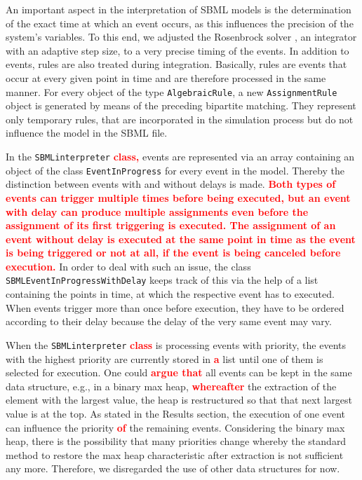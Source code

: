 \documentclass[10pt]{bmc_article}
\newenvironment{bmcformat}{\baselineskip20pt\sloppy\setboolean{publ}{false}}{\baselineskip20pt\sloppy}
\newcommand{\TODO}[1]{\textcolor{red}{\textbf{#1}}}
\newcommand{\AlgebraicRule}{\texttt{Algebraic\-Rule}}
\newcommand{\AssignmentRule}{\texttt{Assignment\-Rule}}
\newcommand{\SBMLinterpreter}{\texttt{SBML\-interpreter}}
\newcommand{\EventInProgress}{\texttt{Event\-In\-Progress}}
\newcommand{\SBMLEventInProgressWithDelay}{\texttt{SBML\-Event\-In\-Progress\-With\-Delay}}
\begin{document}
\begin{bmcformat}
%
An important aspect in the interpretation of SBML models is the
determination of the exact time at which an event occurs, as this influences
the precision of the system's variables. To this end, we adjusted the Rosenbrock
solver \cite{Kotcon2011}, an integrator with an adaptive step size, to a very
precise timing of the events.
% 
In addition to events, rules are also treated during integration.
Basically, rules are events that occur at every given point in time and are therefore processed in the same manner.
For every object of the type \AlgebraicRule{}, a new \AssignmentRule{} object is generated by means of the preceding bipartite matching.
They represent only temporary rules, that are incorporated in the simulation process but do not influence the model in the SBML file.
%

In the \SBMLinterpreter{} \TODO{class,} events are represented via an array containing an object of the class \EventInProgress{} for every event in the model. Thereby the distinction between events with and without delays is made. 
\TODO{Both types of events can trigger multiple times before being executed, but an event with delay can produce
multiple assignments even before the assignment of its first triggering is executed. The assignment of an event without delay is executed at the same point in time as the event is being triggered or not at all, if the event is being canceled before execution.} In order to deal with such an issue, the class \SBMLEventInProgressWithDelay{} keeps track of this via the help of a list containing the points in time, at which the respective event has to executed. When events trigger more than once before execution, they have to be ordered according to their delay because the delay of the very same event may vary.

When the \SBMLinterpreter{} \TODO{class} is processing events with priority, the events with the highest priority are currently stored in \TODO{a} list until one of them is selected for execution. One could \TODO{argue that} all events can be kept in the same data structure, e.g., in a binary max heap, \TODO{whereafter} the extraction of the element with the largest value, the heap is restructured so that that next largest value is at the top. As stated in the Results section, the execution of one event can influence the priority \TODO{of} the remaining events. Considering the binary max heap, there is the possibility that many priorities change whereby the standard method to restore the max heap characteristic after extraction is not sufficient any more. Therefore, we disregarded the use of other data structures for now.
%


\end{bmcformat}
\end{document}
